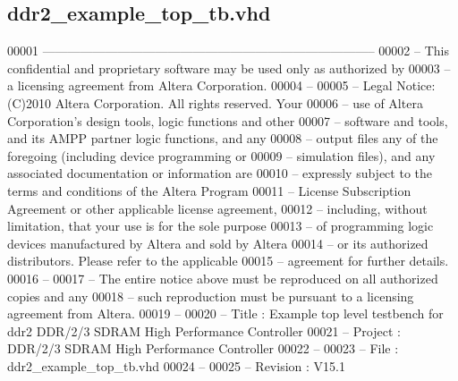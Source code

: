 \subsection{ddr2\+\_\+example\+\_\+top\+\_\+tb.\+vhd}
\label{ddr2__example__top__tb_8vhd_source}

\begin{DoxyCode}
00001 \textcolor{keyword}{--------------------------------------------------------------------------------}
00002 \textcolor{keyword}{-- This confidential and proprietary software may be used only as authorized by}
00003 \textcolor{keyword}{-- a licensing agreement from Altera Corporation.}
00004 \textcolor{keyword}{--}
00005 \textcolor{keyword}{-- Legal Notice: (C)2010 Altera Corporation. All rights reserved.  Your}
00006 \textcolor{keyword}{-- use of Altera Corporation's design tools, logic functions and other}
00007 \textcolor{keyword}{-- software and tools, and its AMPP partner logic functions, and any}
00008 \textcolor{keyword}{-- output files any of the foregoing (including device programming or}
00009 \textcolor{keyword}{-- simulation files), and any associated documentation or information are}
00010 \textcolor{keyword}{-- expressly subject to the terms and conditions of the Altera Program}
00011 \textcolor{keyword}{-- License Subscription Agreement or other applicable license agreement,}
00012 \textcolor{keyword}{-- including, without limitation, that your use is for the sole purpose}
00013 \textcolor{keyword}{-- of programming logic devices manufactured by Altera and sold by Altera}
00014 \textcolor{keyword}{-- or its authorized distributors.  Please refer to the applicable}
00015 \textcolor{keyword}{-- agreement for further details.}
00016 \textcolor{keyword}{--}
00017 \textcolor{keyword}{-- The entire notice above must be reproduced on all authorized copies and any}
00018 \textcolor{keyword}{-- such reproduction must be pursuant to a licensing agreement from Altera.}
00019 \textcolor{keyword}{--}
00020 \textcolor{keyword}{-- Title        : Example top level testbench for ddr2 DDR/2/3 SDRAM High Performance Controller}
00021 \textcolor{keyword}{-- Project      : DDR/2/3 SDRAM High Performance Controller}
00022 \textcolor{keyword}{--}
00023 \textcolor{keyword}{-- File         : ddr2\_example\_top\_tb.vhd}
00024 \textcolor{keyword}{--}
00025 \textcolor{keyword}{-- Revision     : V15.1}

\end{DoxyCode}
